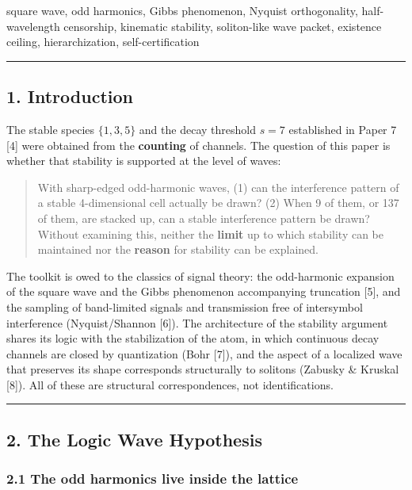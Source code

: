 \documentclass[
]{article}
\begin{document}
square wave, odd harmonics, Gibbs phenomenon, Nyquist orthogonality,
half-wavelength censorship, kinematic stability, soliton-like wave
packet, existence ceiling, hierarchization, self-certification

\begin{center}\rule{0.5\linewidth}{0.5pt}\end{center}

\subsection{1. Introduction}\label{introduction}

The stable species \(\{1,3,5\}\) and the decay threshold \(s=7\)
established in Paper 7 {[}4{]} were obtained from the \textbf{counting}
of channels. The question of this paper is whether that stability is
supported at the level of waves:

\begin{quote}
With sharp-edged odd-harmonic waves, (1) can the interference pattern of
a stable 4-dimensional cell actually be drawn? (2) When 9 of them, or
137 of them, are stacked up, can a stable interference pattern be drawn?
Without examining this, neither the \textbf{limit} up to which stability
can be maintained nor the \textbf{reason} for stability can be
explained.
\end{quote}

The toolkit is owed to the classics of signal theory: the odd-harmonic
expansion of the square wave and the Gibbs phenomenon accompanying
truncation {[}5{]}, and the sampling of band-limited signals and
transmission free of intersymbol interference (Nyquist/Shannon {[}6{]}).
The architecture of the stability argument shares its logic with the
stabilization of the atom, in which continuous decay channels are closed
by quantization (Bohr {[}7{]}), and the aspect of a localized wave that
preserves its shape corresponds structurally to solitons (Zabusky \&
Kruskal {[}8{]}). All of these are structural correspondences, not
identifications.

\begin{center}\rule{0.5\linewidth}{0.5pt}\end{center}

\subsection{2. The Logic Wave
Hypothesis}\label{the-logic-wave-hypothesis}

\subsubsection{2.1 The odd harmonics live inside the
lattice}\label{the-odd-harmonics-live-inside-the-lattice}
\end{document}
